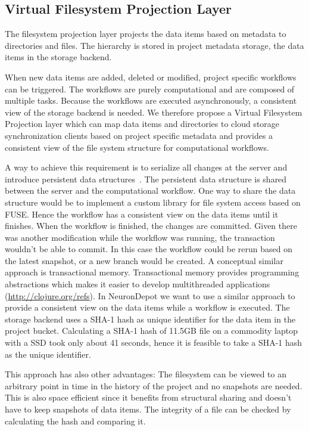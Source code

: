 \documentclass{frontiersSCNS} %
\begin{document}
\subsection{Virtual Filesystem Projection Layer}\label{sec:projection_layer}
The filesystem projection layer projects the data items based on metadata to
directories and files. The hierarchy is stored in project metadata storage, the
data items in the storage backend.

When new data items are added, deleted or modified, project specific workflows
can be triggered.  The workflows are purely computational and are composed of
multiple tasks. Because the workflows are executed asynchronously, a consistent
view of the storage backend is needed. We therefore propose a Virtual
Filesystem Projection layer which can map data items and directories to cloud
storage synchronization clients based on project specific metadata and provides
a consistent view of the file system structure for computational workflows.

A way to achieve this requirement is to serialize all changes at the server and
introduce persistent data structures~\cite{Driscoll1989}. The persistent data
structure is shared between the server and the computational workflow. One way
to share the data structure would be to implement a custom library for file
system access based on FUSE.  Hence the workflow has a consistent view on the
data items until it finishes. When the workflow is finished, the changes are
committed. Given there was another modification while the workflow was running,
the transaction wouldn’t be able to commit. In this case the workflow could be
rerun based on the latest snapshot, or a new branch would be created. A
conceptual similar approach is transactional memory. Transactional memory
provides programming abstractions which makes it easier to develop
multithreaded applications (\url{http://clojure.org/refs}). In NeuronDepot we
want to use a similar approach to provide a consistent view on the data items
while a workflow is executed. The storage backend uses a SHA-1 hash as unique
identifier for the data item in the project bucket. Calculating a SHA-1 hash of
11.5GB file on a commodity laptop with a SSD took only about 41 seconds, hence
it is feasible to take a SHA-1 hash as the unique identifier.

This approach has also other advantages:  The filesystem can be viewed to an
arbitrary point in time in the history of the project and no snapshots are
needed. This is also space efficient since it benefits from structural sharing
and doesn’t have to keep snapshots of data items. The integrity of a file can
be checked by calculating the hash and comparing it.
\end{document}
